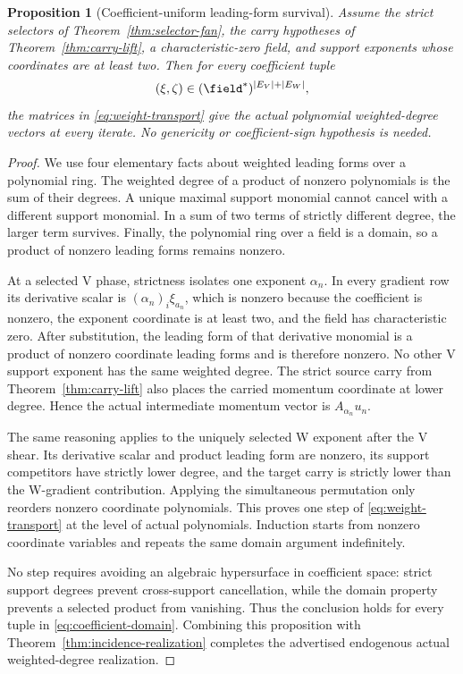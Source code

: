 \documentclass[11pt,letterpaper]{article}
\newtheorem{proposition}[theorem]{Proposition}
\theoremstyle{definition}
\theoremstyle{remark}
\numberwithin{equation}{section}
\begin{document}
\begin{proposition}[Coefficient-uniform leading-form survival]
\label{prop:leading-survival}
Assume the strict selectors of Theorem~\ref{thm:selector-fan}, the carry
hypotheses of Theorem~\ref{thm:carry-lift}, a characteristic-zero field, and
support exponents whose coordinates are at least two.  Then for every
coefficient tuple
\begin{equation}
 (\xi,\zeta)\in(\field^*)^{|E_V|+|E_W|},
 \label{eq:coefficient-domain}
\end{equation}
the matrices in \eqref{eq:weight-transport} give the actual polynomial
weighted-degree vectors at every iterate.  No genericity or coefficient-sign
hypothesis is needed.
\end{proposition}

\begin{proof}
We use four elementary facts about weighted leading forms over a polynomial
ring.  The weighted degree of a product of nonzero polynomials is the sum of
their degrees.  A unique maximal support monomial cannot cancel with a
different support monomial.  In a sum of two terms of strictly different
degree, the larger term survives.  Finally, the polynomial ring over a field
is a domain, so a product of nonzero leading forms remains nonzero.

At a selected V phase, strictness isolates one exponent \(\alpha_n\).  In
every gradient row its derivative scalar is
\((\alpha_n)_i\xi_{a_n}\), which is nonzero because the coefficient is
nonzero, the exponent coordinate is at least two, and the field has
characteristic zero.  After substitution, the leading form of that
derivative monomial is a product of nonzero coordinate leading forms and is
therefore nonzero.  No other V support exponent has the same weighted
degree.  The strict source carry from Theorem~\ref{thm:carry-lift} also places
the carried momentum coordinate at lower degree.  Hence the actual
intermediate momentum vector is \(A_{\alpha_n}u_n\).

The same reasoning applies to the uniquely selected W exponent after the V
shear.  Its derivative scalar and product leading form are nonzero, its
support competitors have strictly lower degree, and the target carry is
strictly lower than the W-gradient contribution.  Applying the simultaneous
permutation only reorders nonzero coordinate polynomials.  This proves one
step of \eqref{eq:weight-transport} at the level of actual polynomials.
Induction starts from nonzero coordinate variables and repeats the same
domain argument indefinitely.

No step requires avoiding an algebraic hypersurface in coefficient space:
strict support degrees prevent cross-support cancellation, while the domain
property prevents a selected product from vanishing.  Thus the conclusion
holds for every tuple in \eqref{eq:coefficient-domain}.  Combining this
proposition with Theorem~\ref{thm:incidence-realization} completes the
advertised endogenous actual weighted-degree realization.
\end{proof}
\end{document}
